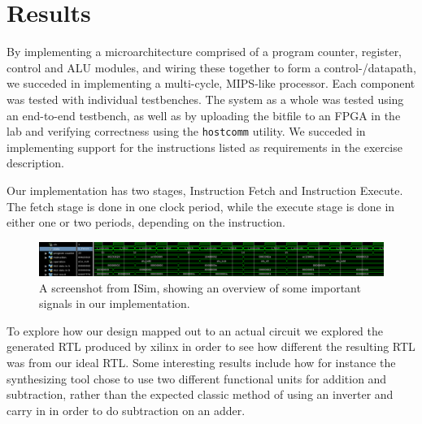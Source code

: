 \chapter{Results}

By implementing a microarchitecture comprised of a program counter, register, control and ALU modules, and wiring these together to form a control-/datapath, we succeded in implementing a multi-cycle, MIPS-like processor.
Each component was tested with individual testbenches.
The system as a whole was tested using an end-to-end testbench, as well as by uploading the bitfile to an FPGA in the lab and verifying correctness using the \texttt{hostcomm} utility.
We succeded in implementing support for the instructions listed as requirements in the exercise description.

Our implementation has two stages, Instruction Fetch and Instruction Execute.
The fetch stage is done in one clock period, while the execute stage is done in either one or two periods, depending on the instruction.

\begin{figure}[h!]
    \includegraphics[width=\linewidth]{img/overview_sim.png}
    \caption{A screenshot from ISim, showing an overview of some important signals in our implementation.}
    \label{fig:waves}
\end{figure}

To explore how our design mapped out to an actual circuit we explored the generated RTL produced by xilinx in order to see how different the resulting RTL was from our ideal RTL.
Some interesting results include how for instance the synthesizing tool chose to use two different functional units for addition and subtraction, rather than the expected classic method of using an inverter and carry in in order to do subtraction on an adder.
